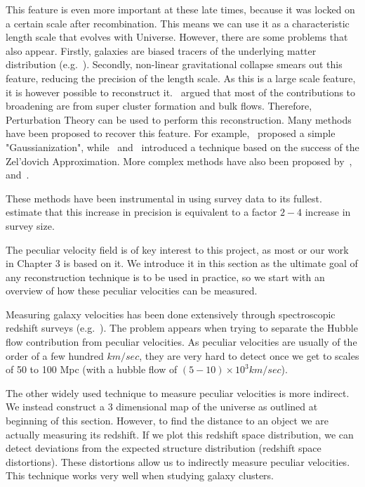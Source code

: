 This feature is even more important at these late times, because it was locked on a certain scale after recombination. This means we can use it as a characteristic length scale that evolves with Universe. However, there are some problems that also appear. Firstly, galaxies are biased tracers of the underlying matter distribution (e.g.~\cite{2016arXiv161109787D}). Secondly, non-linear gravitational collapse smears out this feature, reducing the precision of the length scale. As this is a large scale feature, it is however possible to reconstruct it.~\cite{Eisenstein_BAOpeak_reconstruction} argued that most of the contributions to broadening are from super cluster formation and bulk flows. Therefore, Perturbation Theory can be used to perform this reconstruction. Many methods have been proposed to recover this feature. For example,~\cite{1992MNRAS.254..315W} proposed a simple "Gaussianization", while~\cite{1992ApJ...391..443N} and~\cite{1993ApJ...405..449G} introduced a technique based on the success of the Zel'dovich Approximation. More complex methods have also been proposed by~\cite{1999MNRAS.308..763M},~\cite{1997MNRAS.285..793C} and~\cite{2003MNRAS.346..501B}.

These methods have been instrumental in using survey data to its fullest.~\cite{2013PhR...530...87W} estimate that this increase in precision is equivalent to a factor $2-4$ increase in survey size.

The peculiar velocity field is of key interest to this project, as most or our work in Chapter 3 is based on it. We introduce it in this section as the ultimate goal of any reconstruction technique is to be used in practice, so we start with an overview of how these peculiar velocities can be measured. 

Measuring galaxy velocities has been done extensively through spectroscopic redshift surveys (e.g.~\cite{2013AJ....145...10D}). The problem appears when trying to separate the Hubble flow contribution from peculiar velocities. As peculiar velocities are usually of the order of a few hundred $km/sec$, they are very hard to detect once we get to scales of 50 to 100 Mpc (with a hubble flow of $(5-10) \times 10^3 km/sec$). 

The other widely used technique to measure peculiar velocities is more indirect. We instead construct a 3 dimensional map of the universe as outlined at beginning of this section. However, to find the distance to an object we are actually measuring its redshift. If we plot this redshift space distribution, we can detect deviations from the expected structure distribution (redshift space distortions). These distortions allow us to indirectly measure peculiar velocities. This technique works very well when studying galaxy clusters.

